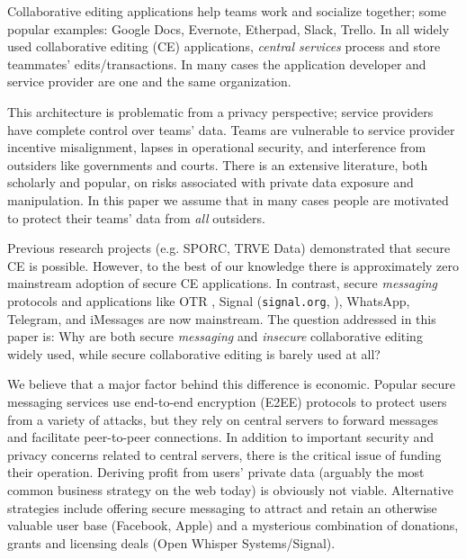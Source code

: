 \documentclass[runningheads]{llncs}
\begin{document}
Collaborative editing applications help teams work and socialize together; some popular examples: Google Docs, Evernote, Etherpad, Slack, Trello.
In all widely used collaborative editing (CE) applications, \emph{central services} process and store teammates' edits{\slash}transactions.
In many cases the application developer and service provider are one and the same organization.

This architecture is problematic from a privacy perspective; service providers have complete control over teams' data.
Teams are vulnerable to service provider incentive misalignment, lapses in operational security, and interference from outsiders like governments and courts.
There is an extensive literature, both scholarly and popular, on risks associated with private data exposure and manipulation.
In this paper we assume that in many cases people are motivated to protect their teams' data from \emph{all} outsiders.

Previous research projects (e.g. SPORC\cite{Feldman2010}, TRVE Data\cite{Kleppmann2018}) demonstrated that secure CE is possible.
However, to the best of our knowledge there is approximately zero mainstream adoption of secure CE applications.
In contrast, secure \emph{messaging} protocols and applications like OTR \cite{Borisov2004}, Signal (\texttt{signal.org}, \cite{Cohn-Gordon2018}), WhatsApp, Telegram, and iMessages are now mainstream.
The question addressed in this paper is: Why are both secure \emph{messaging} and \emph{insecure} collaborative editing widely used, while secure collaborative editing is barely used at all?\footnotemark{}


We believe that a major factor behind this difference is economic.
Popular secure messaging services use end-to-end encryption (E2EE) protocols to protect users from a variety of attacks, but they rely on central servers to forward messages and facilitate peer-to-peer connections.
In addition to important security and privacy concerns related to central servers, there is the critical issue of funding their operation.
Deriving profit from users' private data (arguably the most common business strategy on the web today) is obviously not viable.
Alternative strategies include offering secure messaging to attract and retain an otherwise valuable user base (Facebook, Apple) and a mysterious combination of donations, grants and licensing deals (Open Whisper Systems{\slash}Signal).
\end{document}
